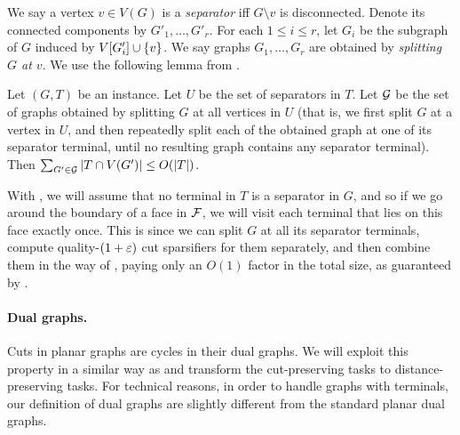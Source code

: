 We say a vertex $v\in V(G)$ is a \emph{separator} iff $G\setminus v$ is disconnected.
Denote its connected components by $G'_1,\ldots,G'_r$.
For each $1\le i\le r$, let $G_i$ be the subgraph of $G$ induced by $V[G'_i]\cup \left\{ v \right\}$. We say graphs $G_1,\ldots,G_r$ are obtained by \emph{splitting $G$ at $v$}.
We use the following lemma from \cite{chang2022near}.

\begin{claim}
\label{clm: separator}
Let $(G,T)$ be an instance.
Let $U$ be the set of separators in $T$. Let ${\mathcal{G}}$ be the set of graphs obtained by splitting $G$ at all vertices in $U$ (that is, we first split $G$ at a vertex in $U$, and then repeatedly split each of the obtained graph at one of its separator terminal, until no resulting graph contains any separator terminal). Then
$\sum_{G'\in {\mathcal{G}}}|T\cap V(G')|\le O(|T|)$.
\end{claim}

With , we will assume that no terminal in $T$ is a separator in $G$, and so if we go around the boundary of a face in ${\mathcal{F}}$, we will visit each terminal that lies on this face exactly once. This is since we can split $G$ at all its separator terminals, compute quality-$(1+{\varepsilon})$ cut sparsifiers for them separately, and then combine them in the way of , paying only an $O(1)$ factor in the total size, as guaranteed by .

\paragraph{Dual graphs.}
Cuts in planar graphs are cycles in their dual graphs. We will exploit this property in a similar way as \cite{krauthgamer2017refined} and transform the cut-preserving tasks to distance-preserving tasks. For technical reasons, in order to handle graphs with terminals, our definition of dual graphs are slightly different from the standard planar dual graphs.

